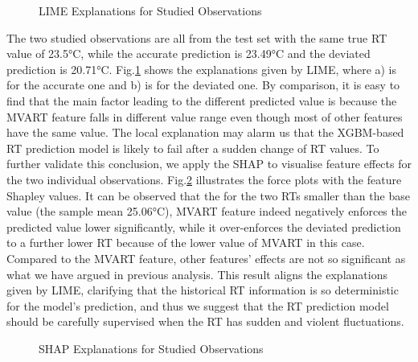 \documentclass[11pt]{article}
\begin{document}
    \begin{figure}[htbp]
        \centering
        \caption{LIME Explanations for Studied Observations}
        \label{LIME_res}
    \end{figure}    
    
    The two studied observations are all from the test set with the same true RT value of 23.5°C, while the accurate prediction is 23.49°C and the deviated prediction is 20.71°C. Fig.\ref{LIME_res} shows the explanations given by LIME, where a) is for the accurate one and b) is for the deviated one. By comparison, it is easy to find that the main factor leading to the different predicted value is because the MVART feature falls in different value range even though most of other features have the same value. The local explanation may alarm us that the XGBM-based RT prediction model is likely to fail after a sudden change of RT values. To further validate this conclusion, we apply the SHAP to visualise feature effects for the two individual observations. Fig.\ref{SHAP_res} illustrates the force plots with the feature Shapley values. It can be observed that the for the two RTs smaller than the base value (the sample mean 25.06°C), MVART feature indeed negatively enforces the predicted value lower significantly, while it over-enforces the deviated prediction to a further lower RT because of the lower value of MVART in this case. Compared to the MVART feature, other features’ effects are not so significant as what we have argued in previous analysis. This result aligns the explanations given by LIME, clarifying that the historical RT information is so deterministic for the model’s prediction, and thus we suggest that the RT prediction model should be carefully supervised when the RT has sudden and violent fluctuations.
    
     \begin{figure}[htbp]
        \centering
        \caption{SHAP Explanations for Studied Observations}
        \label{SHAP_res}
    \end{figure}    
\end{document}
